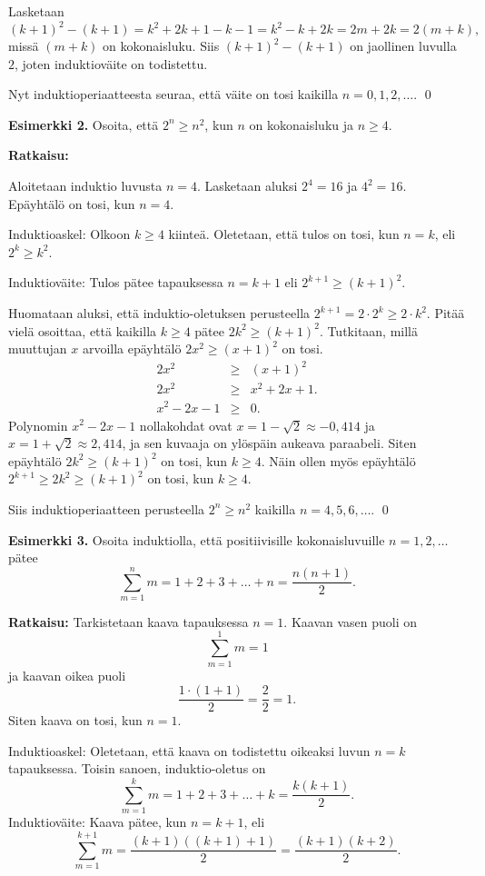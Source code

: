 Lasketaan
\[
(k+1)^2-(k+1)= k^2+2k+1-k-1= k^2-k +2k=2m +2k =2(m+k),
\]
missä $(m+k)$ on kokonaisluku. Siis $(k+1)^2-(k+1)$ on jaollinen luvulla $2$, joten induktioväite on todistettu.

Nyt induktioperiaatteesta seuraa, että väite on tosi kaikilla $n=0,1,2,\ldots$.
\qed


{\bf Esimerkki 2.} Osoita, että $2^n \ge n^2$, kun $n$ on kokonaisluku ja $n \ge 4$.

{\bf Ratkaisu:}

Aloitetaan induktio luvusta $n=4$. Lasketaan aluksi $2^4 = 16$ ja $4^2 = 16$. Epäyhtälö on tosi, kun $n=4$.

Induktioaskel: Olkoon $k\ge 4$ kiinteä. Oletetaan, että tulos on tosi, kun $n=k$, eli $2^k \ge k^2$.

Induktioväite: Tulos pätee tapauksessa $n=k+1$ eli $2^{k+1} \ge (k+1)^2$.

Huomataan aluksi, että induktio-oletuksen perusteella $2^{k+1} = 2 \cdot 2^k \ge 2 \cdot k^2$. Pitää vielä osoittaa, että kaikilla $k \ge 4$ pätee $2k^2 \ge (k + 1)^2$.
Tutkitaan, millä muuttujan $x$ arvoilla epäyhtälö $2x^2 \ge (x + 1)^2$ on tosi.
\begin{eqnarray*}
 2x^2 &\ge& (x + 1)^2\\
 2x^2 &\ge& x^2 + 2x + 1.\\ 
x^2 - 2x - 1 &\ge& 0.
\end{eqnarray*}
Polynomin $x^2 - 2x - 1$ nollakohdat ovat $x = 1 - \sqrt{2}\approx -0,414$ ja $x = 1 + \sqrt{2}\approx 2,414$, ja sen kuvaaja on ylöspäin aukeava paraabeli. Siten epäyhtälö $2k^2 \ge (k + 1)^2$ on tosi, kun $k \ge 4$. Näin ollen myös epäyhtälö $2^{k+1} \ge 2k^2 \ge (k + 1)^2$ on tosi, kun $k \ge 4$. 

Siis induktioperiaatteen perusteella $2^n \ge n^2$ kaikilla $n=4,5,6,\ldots$.
\qed




{\bf Esimerkki 3.} Osoita induktiolla, että
positiivisille kokonaisluvuille $n=1,2,\ldots$ pätee
\[
\sum_{m=1}^n m = 1+2+3+\ldots+n= \frac{n(n+1)}{2}.
\]

{\bf Ratkaisu:} Tarkistetaan kaava tapauksessa $n=1$.
Kaavan vasen puoli on
\[
\sum_{m=1}^1 m = 1
\]
ja kaavan oikea puoli
\[
\frac{1\cdot (1+1)}{2}= \frac{2}{2}=1.
\]
Siten kaava on tosi, kun $n=1$.

Induktioaskel: Oletetaan, että kaava on todistettu
oikeaksi luvun $n=k$ tapauksessa. Toisin sanoen,
induktio-oletus on
\[
\sum_{m=1}^k m = 1+2+3+ \ldots + k = \frac{k(k+1)}{2}.
\]
Induktioväite: Kaava pätee, kun $n=k+1$, eli
\[
\sum_{m=1}^{k+1} m = \frac{(k+1)((k+1)+1)}{2} =
\frac{(k+1)(k+2)}{2}.
\]

